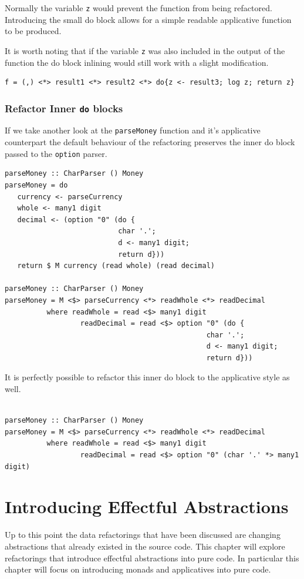 Normally the variable \texttt{z} would prevent the function from being refactored. Introducing the small do block allows for a simple readable applicative function to be produced. 

It is worth noting that if the variable \texttt{z} was also included in the output of the function the do block inlining would still work with a slight modification.

\begin{lstlisting}[frame=tblr]
f = (,) <*> result1 <*> result2 <*> do{z <- result3; log z; return z}
\end{lstlisting}

\subsection{Refactor Inner \texttt{do} blocks}
If we take another look at the \texttt{parseMoney} function and it's applicative counterpart the default behaviour of the refactoring preserves the inner do block passed to the \texttt{option} parser.

\begin{lstlisting}[frame=tlrb]
parseMoney :: CharParser () Money
parseMoney = do
   currency <- parseCurrency 
   whole <- many1 digit
   decimal <- (option "0" (do { 
                           char '.';
                           d <- many1 digit;
                           return d}))
   return $ M currency (read whole) (read decimal)
   
parseMoney :: CharParser () Money
parseMoney = M <$> parseCurrency <*> readWhole <*> readDecimal
          where readWhole = read <$> many1 digit
                  readDecimal = read <$> option "0" (do { 
                           						char '.';
                          						d <- many1 digit;
                           						return d}))
\end{lstlisting}

It is perfectly possible to refactor this inner do block to the applicative style as well.

\begin{lstlisting}[frame=tblr]

parseMoney :: CharParser () Money
parseMoney = M <$> parseCurrency <*> readWhole <*> readDecimal
          where readWhole = read <$> many1 digit
                  readDecimal = read <$> option "0" (char '.' *> many1 digit)
\end{lstlisting}


\chapter{Introducing Effectful Abstractions}
Up to this point the data refactorings that have been discussed are changing abstractions that already existed in the source code. This chapter will explore refactorings that introduce effectful abstractions into pure code. In particular this chapter will focus on introducing monads and applicatives into pure code.

